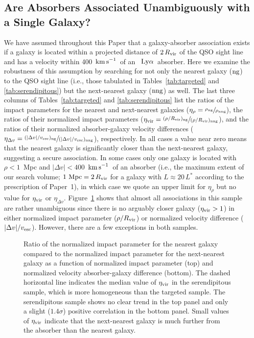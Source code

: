 \documentclass[twocolumn,twocolappendix,tighten,times]{aastex6}
\newcommand{\HI}{\ion{H}{1}}
\newcommand{\kms}{\ensuremath{{\rm km\,s}^{-1}}}
\newcommand{\lya}{\ensuremath{{\rm Ly}\alpha}}
\begin{document}
\subsection{Are Absorbers Associated Unambiguously with a Single Galaxy?}
\label{discussion:association}

We have assumed throughout this Paper that a galaxy-absorber association exists 
if a galaxy is located within a projected distance of $2\,R_{\rm vir}$ of the 
QSO sight line and has a velocity within 400~\kms\ of an \HI\ \lya\ absorber. 
Here we examine the robustness of this assumption by searching for not only the 
nearest galaxy (${\rm ng}$) to the QSO sight line (i.e., those tabulated in 
Tables~\ref{tab:targeted} and \ref{tab:serendipitous}) but the next-nearest
galaxy (${\rm nng}$) as well. The last three columns of Tables~\ref{tab:targeted} 
and \ref{tab:serendipitous} list the ratios of the impact parameters for the 
nearest and next-nearest galaxies 
($\eta_{\rho} = \sfrac{\rho_{\rm ng}}{\rho_{\rm nng}}$), the ratios of their 
normalized impact parameters 
($\eta_{\rm vir} = \sfrac{(\rho/R_{\rm vir})_{\rm ng}}{(\rho/R_{\rm vir})_{\rm nng}}$), 
and the ratios of their normalized absorber-galaxy velocity differences
($\eta_{\Delta v} = \sfrac{(|\Delta v|/v_{\rm esc})_{\rm ng}}{(|\Delta v|/v_{\rm esc})_{\rm nng}}$),
respectively. In all cases a value near zero means that the nearest galaxy 
is significantly closer than the next-nearest galaxy, suggesting a secure 
association. In some cases only one galaxy is located with $\rho<1$~Mpc and 
$|\Delta v|<400$~\kms\ of an absorber (i.e., the maximum extent of our search 
volume; $1~{\rm Mpc} = 2\,R_{\rm vir}$ for a galaxy with $L\approx20\,L^*$ 
according to the prescription of Paper~1), in which case we quote an upper limit 
for $\eta_{\rho}$ but no value for $\eta_{\rm vir}$ or $\eta_{\Delta v}$. 
Figure~\ref{fig:etavir} shows that almost all associations in this sample are 
rather unambiguous since there is no arguably closer galaxy ($\eta_{\rm vir} > 1$) 
in either normalized impact parameter ($\rho/R_{\rm vir}$) or normalized velocity 
difference ($|\Delta v|/v_{\rm esc}$). However, there are a few exceptions in both 
samples.


\begin{figure}[!t]
\caption{Ratio of the normalized impact parameter for the nearest galaxy compared to the normalized impact parameter for the next-nearest galaxy as a function of normalized impact parameter (top) and normalized velocity absorber-galaxy difference (bottom). The dashed horizontal line indicates the median value of $\eta_{\rm vir}$ in the serendipitous sample, which is more homogeneous than the targeted sample. The serendipitous sample shows no clear trend in the top panel and only a slight ($1.4\sigma$) positive correlation in the bottom panel. Small values of $\eta_{\rm vir}$ indicate that the next-nearest galaxy is much further from the absorber than the nearest galaxy.
\label{fig:etavir}}
\end{figure}
\end{document}
